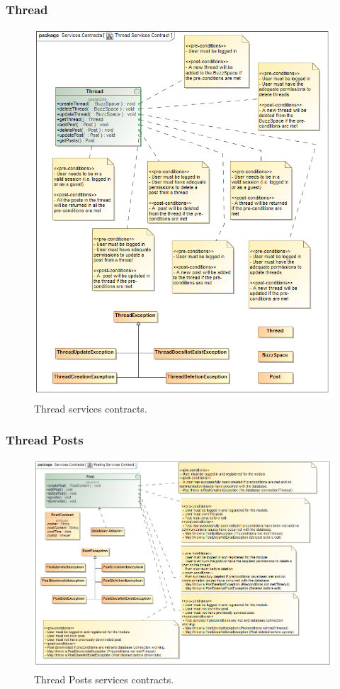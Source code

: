 \documentclass [a4paper,12pt] {article}
\begin{document}
		\subsubsection{Thread}
			\begin{figure}[H]
				\centering
				\includegraphics[width=1.0\textwidth]{ThreadSC.png}
				\caption{Thread services contracts.}
			\end{figure}	
		\subsubsection{Thread Posts}
		\begin{figure}[H]
			\centering
			\includegraphics[width=1.0\textwidth]{ThreadPostsSC.png}
			\caption{Thread Posts services contracts.}
		\end{figure}	
\end{document}
